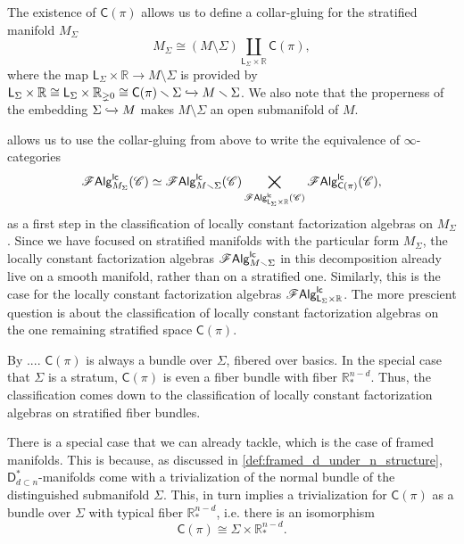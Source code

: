 \documentclass[../text]{subfiles}
\begin{document}
\begin{construction}
    The existence of $\mathsf{C}(\pi)$ allows us to define a collar-gluing for the stratified manifold $M_\Sigma$
    \begin{equation}\label{eq:M_Sigma_decomposition}
        M_\Sigma \cong \left( M \setminus \Sigma \right) \coprod_{\mathsf{L}_\Sigma \times \mathbb{R}} \mathsf{C}(\pi),
    \end{equation}
    where the map $\mathsf{L}_\Sigma \times \mathbb{R} \rightarrow M \setminus \Sigma$ is provided by $\mathsf{L}_\Sigma \times \mathbb{R} \cong \mathsf{L}_\Sigma \times \mathbb{R}_{\gneq 0} \cong \mathsf{C}(\pi) \setminus \Sigma \xhookrightarrow{} M \setminus \Sigma$. We also note that the properness of the embedding $\Sigma \xhookrightarrow{} M$ makes $M \setminus \Sigma$ an open submanifold of $M$.
\end{construction}


 allows us to use the collar-gluing from above to write the equivalence of $\infty$-categories
%
\begin{equation}
    \lcfa_{M_\Sigma} (\catC) \simeq \lcfa_{M \setminus \Sigma} (\catC) \bigtimes_{\lcfa_{\mathsf{L}_\Sigma \times \mathbb{R}} (\catC)} \lcfa_{\mathsf{C}(\pi)} (\catC),
\end{equation}
%
as a first step in the classification of locally constant factorization algebras on $M_{\Sigma}$. Since we have focused on stratified manifolds with the particular form $M_{\Sigma}$, the locally constant factorization algebras $\lcfa_{M \setminus \Sigma}$ in this decomposition already live on a smooth manifold, rather than on a stratified one. Similarly, this is the case for the locally constant factorization algebras $\lcfa_{\mathsf{L}_\Sigma \times \mathbb{R}}$. The more prescient question is about the classification of locally constant factorization algebras on the one remaining stratified space $\mathsf{C}(\pi)$. 

By .... $\mathsf{C}(\pi)$ is always a bundle over $\Sigma$, fibered over basics. In the special case that $\Sigma$ is a stratum, $\mathsf{C}(\pi)$ is even a fiber bundle with fiber $\mathbb{R}^{n-d}_*$. Thus, the classification comes down to the classification of locally constant factorization algebras on stratified fiber bundles.

There is a special case that we can already tackle, which is the case of framed manifolds. This is because, as discussed in \cref{def:framed_d_under_n_structure}, $\mathsf{D}_{d \subset n}^*$-manifolds come with a trivialization of the normal bundle of the distinguished submanifold $\Sigma$. This, in turn implies a trivialization for $\mathsf{C}(\pi)$ as a bundle over $\Sigma$ with typical fiber $\mathbb{R}^{n-d}_*$, i.e. there is an isomorphism
%
\begin{equation}
    \mathsf{C}(\pi) \cong \Sigma \times \mathbb{R}^{n-d}_*.
\end{equation}
\end{document}
